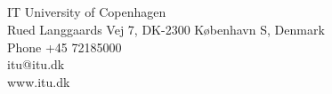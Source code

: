 \documentclass[a4paper,11pt,twoside,onecolumn,openright,final]{memoir}
\begin{document}
\newpage
\hfill\\
\hfill\\
\hfill\\
\hfill\\
\hfill\\
\hfill\\
\hfill\\
\hfill\\
\hfill\\
\hfill\\
\hfill\\
\hfill\\
\hfill\\
\hfill\\
\hfill\\
\hfill\\
\hfill\\
\hfill\\
\hfill\\
\hfill\\
\hfill\\
\hfill\\
\hfill\\
\hfill\\
\hfill\\
\hfill\\
\hfill\\
\hfill\\
\hfill\\
\hfill\\
\hfill\\
\hfill\\
\hfill\\
\hfill\\
\hfill\\
\hfill\\
\linebreak
IT University of Copenhagen\\
Rued Langgaards Vej 7, DK-2300 K\o benhavn S, Denmark\\
Phone +45 72185000\\
itu@itu.dk\\
www.itu.dk\\
\clearpage

\hfill\\
\hfill\\
\hfill\\
\hfill\\
\hfill\\
\hfill\\
\hfill\\
\hfill\\
\hfill\\
\hfill\\
\end{document}
